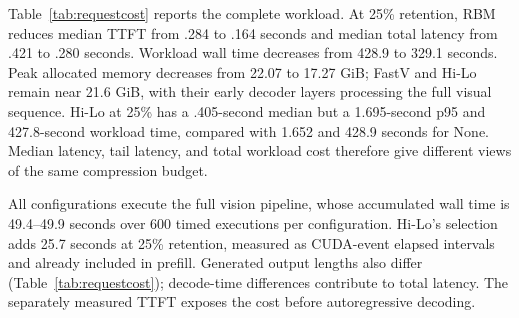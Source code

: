 \documentclass[10pt,twocolumn,letterpaper]{article}
\begin{document}
Table~\ref{tab:requestcost} reports the complete workload. At 25\% retention, RBM reduces median TTFT from .284 to .164 seconds and median total latency from .421 to .280 seconds. Workload wall time decreases from 428.9 to 329.1 seconds. Peak allocated memory decreases from 22.07 to 17.27 GiB; FastV and Hi-Lo remain near 21.6 GiB, with their early decoder layers processing the full visual sequence. Hi-Lo at 25\% has a .405-second median but a 1.695-second p95 and 427.8-second workload time, compared with 1.652 and 428.9 seconds for None. Median latency, tail latency, and total workload cost therefore give different views of the same compression budget.

All configurations execute the full vision pipeline, whose accumulated wall time is 49.4--49.9 seconds over 600 timed executions per configuration. Hi-Lo's selection adds 25.7 seconds at 25\% retention, measured as CUDA-event elapsed intervals and already included in prefill. Generated output lengths also differ (Table~\ref{tab:requestcost}); decode-time differences contribute to total latency. The separately measured TTFT exposes the cost before autoregressive decoding.
\end{document}
